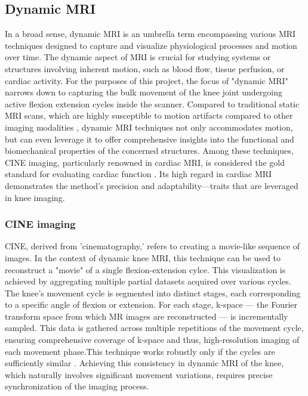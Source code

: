 \documentclass{micro-econ-thesis}
\begin{document}
\subsection{Dynamic MRI}
In a broad sense, dynamic MRI is an umbrella term encompassing various MRI techniques designed to capture and visualize physiological processes and motion over time. The dynamic aspect of MRI is crucial for studying systems or structures involving inherent motion, such as blood flow, tissue perfusion, or cardiac activity. For the purposes of this project, the focus of "dynamic MRI" narrows down to capturing the bulk movement of the knee joint undergoing active flexion extension cycles inside the scanner. Compared to traditional static MRI scans, which are highly susceptible to motion artifacts compared to other imaging modalities \parencite{zaitsev_motion_2015}, dynamic MRI techniques not only accommodates motion, but can even leverage it to offer comprehensive insights into the functional and biomechanical properties of the concerned structures.  Among these techniques, CINE imaging, particularly renowned in cardiac MRI, is considered the gold standard for evaluating cardiac function \parencite{menchon-lara_reconstruction_2019}. Its high regard in cardiac MRI demonstrates the method's precision and adaptability—traits that are leveraged in knee imaging.

\subsubsection{CINE imaging}

CINE, derived from 'cinematography,' refers to creating a movie-like sequence of images. In the context of dynamic knee MRI, this technique can be used to reconstruct a "movie" of a single flexion-extension cylce. This visualization is achieved by aggregating multiple partial datasets acquired over various cycles. The knee's movement cycle is segmented into distinct stages, each corresponding to a specific angle of flexion or extension. For each stage, k-space — the Fourier transform space from which MR images are reconstructed — is incrementally sampled. This data is gathered across multiple repetitions of the movement cycle, ensuring comprehensive coverage of k-space and thus, high-resolution imaging of each movement phase.This technique works robustly only if the cycles are sufficiently similar \parencite{curtis_primer_2022}. Achieving this consistency in dynamic MRI of the knee, which naturally involves significant movement variations, requires precise synchronization of the imaging process.
\end{document}
